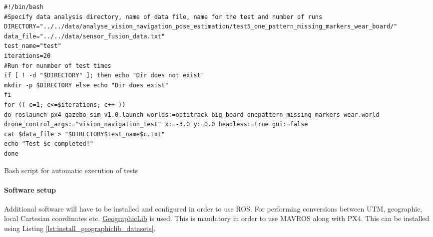 \documentclass[../Head/report.tex]{subfiles}
\begin{document}
\begin{listing}[H] 
\begin{tcolorbox}[
    enhanced,
    attach boxed title to top left={xshift=6mm,yshift=-3mm},
    colback=lightgreen!20,
    colframe=lightgreen,
    fonttitle=\bfseries\color{black},
]
\begin{verbatim}
#!/bin/bash
#Specify data analysis directory, name of data file, name for the test and number of runs
DIRECTORY="../../data/analyse_vision_navigation_pose_estimation/test5_one_pattern_missing_markers_wear_board/"
data_file="../../data/sensor_fusion_data.txt"
test_name="test"
iterations=20
#Run for nunmber of test times 
if [ ! -d "$DIRECTORY" ]; then echo "Dir does not exist" 
mkdir -p $DIRECTORY else echo "Dir does exist"
fi
for (( c=1; c<=$iterations; c++ ))
do roslaunch px4 gazebo_sim_v1.0.launch worlds:=optitrack_big_board_onepattern_missing_markers_wear.world drone_control_args:="vision_navigation_test" x:=-3.0 y:=0.0 headless:=true gui:=false 
cat $data_file > "$DIRECTORY$test_name$c.txt" 
echo "Test $c completed!"
done

\end{verbatim}
\end{tcolorbox}
\caption{Bash script for automatic execution of tests}
\label{lst:bash_script_for_automatic_execution_of_test}    
\end{listing}   

\paragraph{Software setup} 
\label{sec:software_setup_ros}

Additional software will have to be installed and configured in order to use ROS. For performing conversions between UTM, geographic, local Cartesian coordinates etc.  \href{https://geographiclib.sourceforge.io/}{GeographicLib} is used. This is mandatory in order to use MAVROS along with PX4. This can be installed using Listing \ref{lst:install_geographiclib_datasets}.
\end{document}
